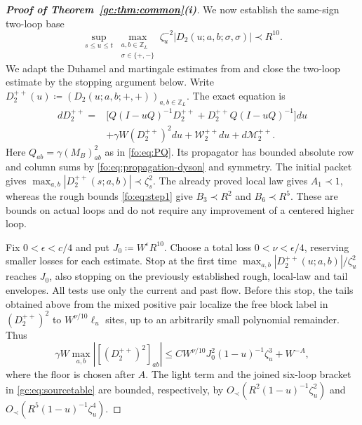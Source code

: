 \documentclass[11pt]{article}
\numberwithin{equation}{section}
\theoremstyle{remark}
\newcommand{\Z}{\mathbb Z}
\begin{document}
\begin{proof}[\textbf{Proof of Theorem~\ref{gc:thm:common}(i)}]
We now establish the same-sign two-loop base
\begin{equation}\label{fo:eq:same-pair}
 \sup_{s\le u\le t}\max_{\substack{a,b\in\Z_L\\\sigma\in\{+,-\}}}
       \zeta_u^{-2}|D_2(u;a,b;\sigma,\sigma)|\prec R^{10}.
\end{equation}
We adapt the Duhamel and martingale estimates from
\cite[proof of Lemma~5.11]{YY} and close the two-loop estimate
by the stopping argument below.
Write $D_2^{++}(u)\coloneqq(D_2(u;a,b;+,+))_{a,b\in\Z_L}$.
The exact equation is
\begin{equation}\label{gc:eq:same-pair-equation}
 \begin{split}
 dD_2^{++}={}&\bigl[Q(I-uQ)^{-1}D_2^{++}
                   +D_2^{++}Q(I-uQ)^{-1}\bigr]du\\
 &+\gamma W(D_2^{++})^2du+\mathcal W_2^{++}du
                         +d\mathcal M_2^{++}.
 \end{split}
\end{equation}
Here $Q_{ab}=\gamma(M_B)_{ab}^2$ as in \eqref{fo:eq:PQ}.
Its propagator has bounded absolute row and column sums by
\eqref{fo:eq:propagation-dyson} and symmetry. The initial packet gives
$\max_{a,b}|D_2^{++}(s;a,b)|\prec\zeta_s^2$.
The already proved local law gives $A_1\prec1$, whereas the rough bounds
\eqref{fo:eq:step1} give $B_3\prec R^2$ and $B_6\prec R^5$.
These are bounds on actual loops and do not require any improvement
of a centered higher loop.

Fix $0<\epsilon<c/4$ and put $J_0\coloneqq W^\epsilon R^{10}$.
Choose a total loss $0<\nu<\epsilon/4$, reserving smaller losses
for each estimate.
Stop at the first time
$\max_{a,b}|D_2^{++}(u;a,b)|/\zeta_u^2$ reaches $J_0$, also stopping
on the previously established rough, local-law and tail envelopes.
All tests use only the current and past flow. Before this stop, the
tails obtained above from the mixed positive pair localize the free
block label in $(D_2^{++})^2$ to $W^{\nu/10}\ell_u$ sites, up to an
arbitrarily small polynomial remainder. Thus
\[
 \gamma W\max_{a,b}|[(D_2^{++})^2]_{ab}|
 \le C W^{\nu/10}J_0^2(1-u)^{-1}\zeta_u^3+W^{-A},
\]
where the floor is chosen after $A$. The light term and the joined
six-loop bracket in \eqref{gc:eq:sourcetable} are bounded, respectively,
by $O_\prec(R^2(1-u)^{-1}\zeta_u^2)$ and
$O_\prec(R^5(1-u)^{-1}\zeta_u^4)$.


\end{proof}
\end{document}
